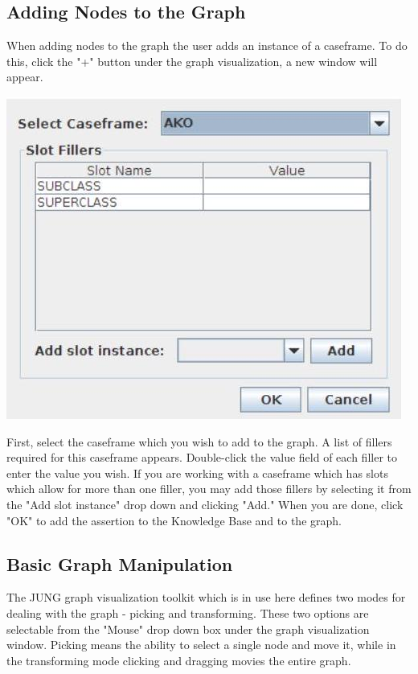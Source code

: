 \documentclass[10pt]{article}
\begin{document}
\subsection{Adding Nodes to the Graph}
When adding nodes to the graph the user adds an instance of a caseframe. To do this, click the "+" button under the graph visualization, a new window will appear.

\begin{center}
\includegraphics[max width=\textwidth]{2023_06_06_402e2c8ca4c84733095bg-5(1)}
\end{center}

First, select the caseframe which you wish to add to the graph. A list of fillers required for this caseframe appears. Double-click the value field of each filler to enter the value you wish. If you are working with a caseframe which has slots which allow for more than one filler, you may add those fillers by selecting it from the "Add slot instance" drop down and clicking "Add." When you are done, click "OK" to add the assertion to the Knowledge Base and to the graph.

\subsection{Basic Graph Manipulation}
The JUNG graph visualization toolkit which is in use here defines two modes for dealing with the graph - picking and transforming. These two options are selectable from the "Mouse" drop down box under the graph visualization window. Picking means the ability to select a single node and move it, while in the transforming mode clicking and dragging movies the entire graph.
\end{document}
